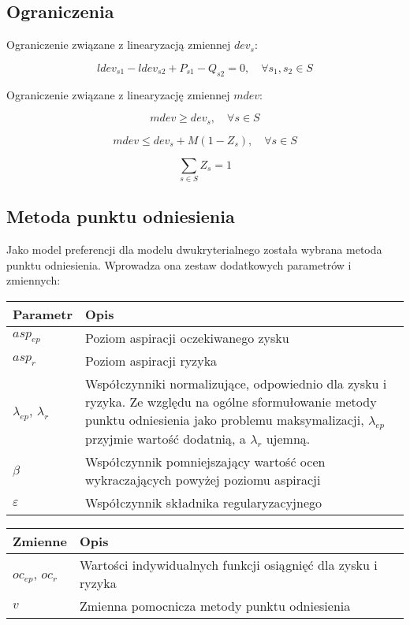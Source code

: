 \documentclass{article}
\begin{document}
\subsection{Ograniczenia}

Ograniczenie związane z linearyzacją zmiennej $dev_s$:

$$lde v_{s1} - lde v_{s2} + P_{s1} - Q_{s2} = 0, \quad \forall s_1, s_2 \in S$$

Ograniczenie związane z linearyzację zmiennej $mdev$:

$$mdev \geqslant dev_s, \quad \forall s \in S$$

$$mdev \leqslant dev_s + M(1 - Z_s), \quad \forall s \in S$$

$$\sum_{s \in S} Z_s = 1$$

\subsection{Metoda punktu odniesienia}

Jako model preferencji dla modelu dwukryterialnego została wybrana metoda punktu odniesienia. Wprowadza ona zestaw dodatkowych parametrów i zmiennych:

\begin{table}[H]
\centering
\begin{tabular}{|l|p{10cm}|}
\hline
Parametr & Opis \\
\hline
$asp_{ep}$ & Poziom aspiracji oczekiwanego zysku \\
\hline
$asp_r$ & Poziom aspiracji ryzyka \\
\hline
$\lambda_{ep}$, $\lambda_r$ & Współczynniki normalizujące, odpowiednio dla zysku i ryzyka. Ze względu na ogólne sformułowanie metody punktu odniesienia jako problemu maksymalizacji, $\lambda_{ep}$ przyjmie wartość dodatnią, a $\lambda_r$ ujemną. \\
\hline
$\beta$ & Współczynnik pomniejszający wartość ocen wykraczających powyżej poziomu aspiracji \\
\hline
$\varepsilon$ & Współczynnik składnika regularyzacyjnego \\
\hline
\end{tabular}

\begin{tabular}{|l|l|}
\hline
Zmienne & Opis \\
\hline
$oc_{ep}$, $oc_r$ & Wartości indywidualnych funkcji osiągnięć dla zysku i ryzyka \\
\hline
$v$ & Zmienna pomocnicza metody punktu odniesienia \\
\hline
\end{tabular}
\end{table}
\end{document}
